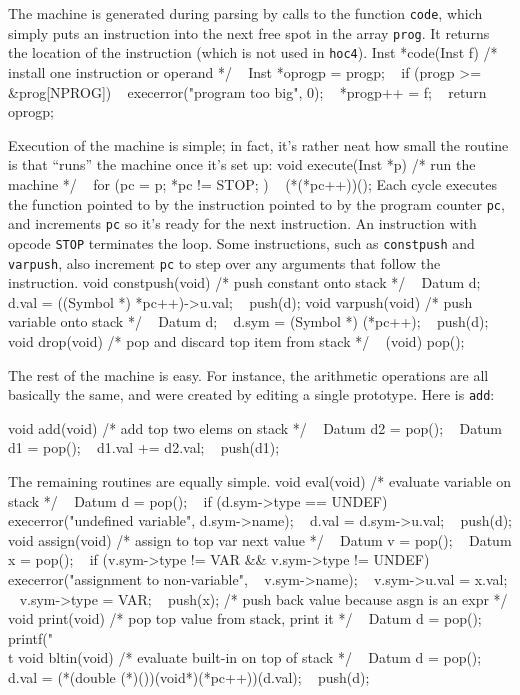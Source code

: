{The machine is generated during parsing by calls to the function
{\tt code}, which simply puts an instruction into the next free
spot in the array {\tt prog}. It returns the location of the
instruction (which is not used in {\tt hoc4}).
\begincode
Inst *code(Inst f)  /* install one instruction or operand */
{
~       Inst *oprogp = progp;
~       if (progp >= &prog[NPROG])
~               execerror("program too big", 0);
~       *progp++ = f;
~       return oprogp;
}
\endcode

Execution of the machine is simple; in fact, it's rather neat how
small the routine is that ``runs'' the machine once it's set up:
\begincode
void execute(Inst *p)  /* run the machine */
{
~       for (pc = p; *pc != STOP; )
~               (*(*pc++))();
}
\endcode
\noindent
Each cycle executes the function pointed to by the instruction
pointed to by the program counter {\tt pc}, and increments {\tt pc}
so it's ready for the next instruction. An instruction with opcode
{\tt STOP} terminates the loop. Some instructions, such as
{\tt constpush} and {\tt varpush}, also increment {\tt pc} to step
over any arguments that follow the instruction.
\begincode
void constpush(void)  /* push constant onto stack */
{
~       Datum d;
~       d.val = ((Symbol *) *pc++)->u.val;
~       push(d);
}
\medbreak
void varpush(void)  /* push variable onto stack */
{
~       Datum d;
~       d.sym = (Symbol *) (*pc++);
~       push(d);
}
\medbreak
void drop(void)  /* pop and discard top item from stack */
{
~       (void) pop();
}
\endcode
{}

The rest of the machine is easy. For instance, the arithmetic
operations are all basically the same, and were created by
editing a single prototype. Here is {\tt add}:

\begincode
void add(void)  /* add top two elems on stack */
{
~       Datum d2 = pop();
~       Datum d1 = pop();
~       d1.val += d2.val;
~       push(d1);
}
\endcode

\noindent
The remaining routines are equally simple.
\begincode
void eval(void)  /* evaluate variable on stack */
{
~       Datum d = pop();
~       if (d.sym->type == UNDEF)
~               execerror("undefined variable", d.sym->name);
~       d.val = d.sym->u.val;
~       push(d);
}
\medbreak
void assign(void)  /* assign to top var next value */
{
~       Datum v = pop();
~       Datum x = pop();
~       if (v.sym->type != VAR && v.sym->type != UNDEF)
~               execerror("assignment to non-variable",
~                         v.sym->name);
~       v.sym->u.val = x.val;
~       v.sym->type = VAR;
~       push(x);  /* push back value because asgn is an expr */
}
\medbreak
void print(void)  /* pop top value from stack, print it */
{
~       Datum d = pop();
~       printf("\\t%
}
\medbreak
void bltin(void)  /* evaluate built-in on top of stack */
{
~       Datum d = pop();
~       d.val = (*(double (*)())(void*)(*pc++))(d.val);
~       push(d);
}
\endcode

}
